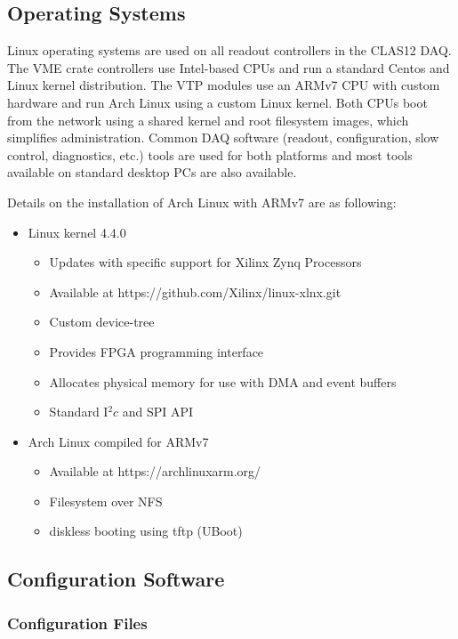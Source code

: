 \subsection{Operating Systems}

Linux operating systems are used on all readout controllers in the CLAS12 DAQ. The VME crate controllers use Intel-based CPUs and run a standard Centos and Linux kernel distribution. The VTP modules use an ARMv7 CPU with custom hardware and run Arch Linux using a custom Linux kernel. Both CPUs boot from the network using a shared kernel and root filesystem images, which simplifies administration. Common DAQ software (readout, configuration, slow control, diagnostics, etc.) tools are used for both platforms and most tools available on standard desktop PCs are also available.

Details on the installation of Arch Linux with ARMv7 are as following:

\begin{itemize}
\item Linux kernel 4.4.0
  \begin{itemize}
  \item Updates with specific support for Xilinx Zynq Processors
  \item Available at https://github.com/Xilinx/linux-xlnx.git
  \item Custom device-tree
  \item Provides FPGA programming interface
  \item Allocates physical memory for use with DMA and event buffers
  \item Standard I$^2c$ and SPI API
  \end{itemize}

\item Arch Linux compiled for ARMv7
  \begin{itemize}
  \item Available at https://archlinuxarm.org/
  \item Filesystem over NFS
  \item diskless booting using tftp (UBoot)
  \end{itemize}
\end{itemize}


\subsection{Configuration Software}

\subsubsection{Configuration Files}

